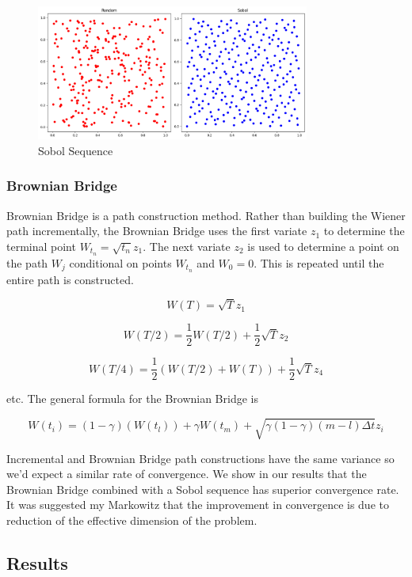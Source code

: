 \documentclass{article}
\newcommand{\para}{\vspace{8pt}} %
\begin{document}
\begin{figure}[ht]
    \centering
    \includegraphics[width=0.8\textwidth]{images/sobol.png}
    \caption{Sobol Sequence}
    \label{fig:sobol}
\end{figure}

\subsubsection{Brownian Bridge}

Brownian Bridge is a path construction method. Rather than building the Wiener path incrementally, the Brownian Bridge uses
the first variate $z_1$ to determine the terminal point $W_{t_n} = \sqrt{t_n}z_1$. The next variate $z_2$ is used to determine a 
point on the path $W_j$ conditional on points $W_{t_n}$ and $W_0=0$. This is repeated until the entire path is constructed. 

\[
W(T) = \sqrt{T}z_1
\]

\[
W(T/2) = \frac{1}{2}W(T/2) + \frac{1}{2}\sqrt{T}z_2
\]

\[
W(T/4) = \frac{1}{2}(W(T/2) + W(T)) + \frac{1}{2}\sqrt{T}z_4
\]

etc. The general formula for the Brownian Bridge is

\[
W(t_i) = (1 - \gamma)(W(t_l)) + \gamma W(t_m) + \sqrt{\gamma(1-\gamma)(m-l)\Delta t}z_i
\]

\para
Incremental and Brownian Bridge path constructions have the same variance so we'd expect a similar rate of convergence. We show in our
results that the Brownian Bridge combined with a Sobol sequence has superior convergence rate. It was suggested my Markowitz\cite{markowitz} 
that the improvement in convergence is due to reduction of the effective dimension of the problem.

\subsection{Results}
\end{document}
